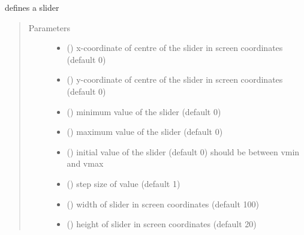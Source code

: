 \documentclass[letterpaper,10pt,english]{sphinxmanual}
\begin{document}

\begin{fulllineitems}
\label{\detokenize{Reference:salabim.AnimateSlider}}
defines a slider
\begin{quote}\begin{description}
\item[{Parameters}] \leavevmode\begin{itemize}
\item {} 
 () \textendash{} x-coordinate of centre of the slider in screen coordinates (default 0)

\item {} 
 () \textendash{} y-coordinate of centre of the slider in screen coordinates (default 0)

\item {} 
 () \textendash{} minimum value of the slider (default 0)

\item {} 
 () \textendash{} maximum value of the slider (default 0)

\item {} 
 () \textendash{} initial value of the slider (default 0) 
should be between vmin and vmax

\item {} 
 () \textendash{} step size of value (default 1)

\item {} 
 () \textendash{} width of slider in screen coordinates (default 100)

\item {} 
 () \textendash{} height of slider in screen coordinates (default 20)


\end{itemize}
\end{description}
\end{quote}
\end{fulllineitems}
\end{document}
